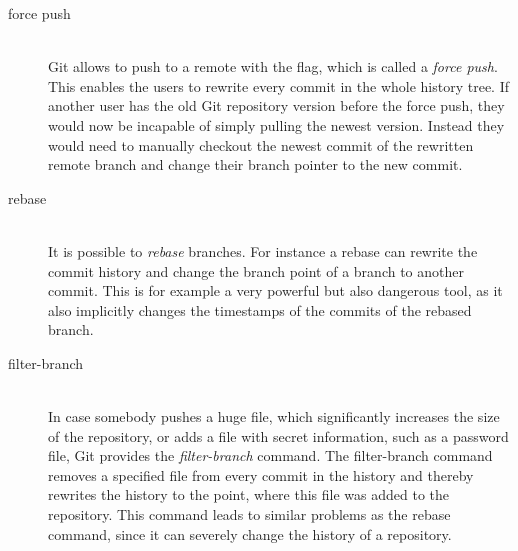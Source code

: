\begin{description}
    \item[force push] \hfill \\
        Git allows to push to a remote with the  flag, which is called a \emph{force push}.
        This enables the users to rewrite every commit in the whole history tree.
        If another user has the old Git repository version before the force push, they would now be incapable of simply pulling the newest version.
        Instead they would need to manually checkout the newest commit of the rewritten remote branch and change their branch pointer to the new commit.

    \item[rebase] \hfill \\
        It is possible to \emph{rebase} branches. For instance a rebase can rewrite the commit history and change the branch point of a branch to another commit.
        This is for example a very powerful but also dangerous tool, as it also implicitly changes the timestamps of the commits of the rebased branch.

    \item[filter-branch] \hfill \\
        In case somebody pushes a huge file, which significantly increases the size of the repository, or adds a file with secret information, such as a password file, Git provides the \emph{filter-branch} command.
        The filter-branch command removes a specified file from every commit in the history and thereby rewrites the history to the point, where this file was added to the repository.
        This command leads to similar problems as the rebase command, since it can severely change the history of a repository.

\end{description}
